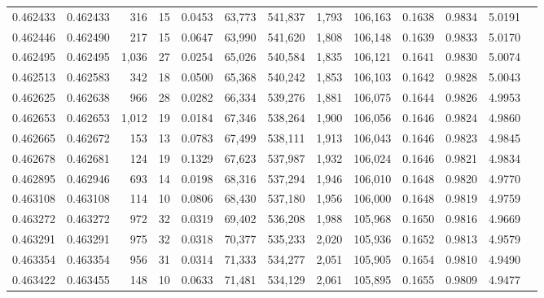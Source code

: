 \begin{tabular}{rrrrrrrrrrrrr}
0.462433 & 0.462433 &   316 &    15 &                                     0.0453 &  63,773 & 541,837 &   1,793 & 106,163 & 0.1638 & 0.9834 & 5.0191 \\
0.462446 & 0.462490 &   217 &    15 &                                     0.0647 &  63,990 & 541,620 &   1,808 & 106,148 & 0.1639 & 0.9833 & 5.0170 \\
0.462495 & 0.462495 & 1,036 &    27 &                                     0.0254 &  65,026 & 540,584 &   1,835 & 106,121 & 0.1641 & 0.9830 & 5.0074 \\
0.462513 & 0.462583 &   342 &    18 &                                     0.0500 &  65,368 & 540,242 &   1,853 & 106,103 & 0.1642 & 0.9828 & 5.0043 \\
0.462625 & 0.462638 &   966 &    28 &                                     0.0282 &  66,334 & 539,276 &   1,881 & 106,075 & 0.1644 & 0.9826 & 4.9953 \\
0.462653 & 0.462653 & 1,012 &    19 &                                     0.0184 &  67,346 & 538,264 &   1,900 & 106,056 & 0.1646 & 0.9824 & 4.9860 \\
0.462665 & 0.462672 &   153 &    13 &                                     0.0783 &  67,499 & 538,111 &   1,913 & 106,043 & 0.1646 & 0.9823 & 4.9845 \\
0.462678 & 0.462681 &   124 &    19 &                                     0.1329 &  67,623 & 537,987 &   1,932 & 106,024 & 0.1646 & 0.9821 & 4.9834 \\
0.462895 & 0.462946 &   693 &    14 &                                     0.0198 &  68,316 & 537,294 &   1,946 & 106,010 & 0.1648 & 0.9820 & 4.9770 \\
0.463108 & 0.463108 &   114 &    10 &                                     0.0806 &  68,430 & 537,180 &   1,956 & 106,000 & 0.1648 & 0.9819 & 4.9759 \\
0.463272 & 0.463272 &   972 &    32 &                                     0.0319 &  69,402 & 536,208 &   1,988 & 105,968 & 0.1650 & 0.9816 & 4.9669 \\
0.463291 & 0.463291 &   975 &    32 &                                     0.0318 &  70,377 & 535,233 &   2,020 & 105,936 & 0.1652 & 0.9813 & 4.9579 \\
0.463354 & 0.463354 &   956 &    31 &                                     0.0314 &  71,333 & 534,277 &   2,051 & 105,905 & 0.1654 & 0.9810 & 4.9490 \\
0.463422 & 0.463455 &   148 &    10 &                                     0.0633 &  71,481 & 534,129 &   2,061 & 105,895 & 0.1655 & 0.9809 & 4.9477 \\

\end{tabular}
